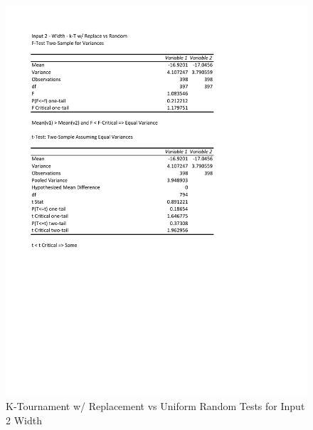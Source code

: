 \documentclass[times]{article}
\begin{document}
	\begin{figure}
		\caption{K-Tournament w/ Replacement vs Uniform Random Tests for Input 2 Width}
		\label{fig:2parent2_moea}
		\includegraphics[width=\textwidth]{./t_test/2_parent2_moea.pdf}
	\end{figure}
\end{document}
